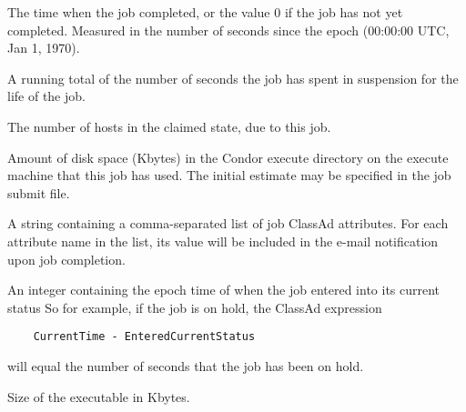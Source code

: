 \begin{description}
\item[\AdAttr{CompletionDate}:]  The time when the job completed,
or the value 0 if the job has not yet completed.
Measured in the
number of seconds since the epoch (00:00:00 UTC, Jan 1, 1970).

\item[\AdAttr{CumulativeSuspensionTime}:]  A running total of the number of
seconds the job has spent in suspension for the life of the job.

\item[\AdAttr{CurrentHosts}:]  The number of hosts in the claimed state,
due to this job.

\item[\AdAttr{DiskUsage}:] Amount of disk space (Kbytes) in the Condor
execute directory on the execute machine that this job has used.
The initial estimate may be specified in the job
submit file.

\item[\AdAttr{EmailAttributes}:]  A string containing a comma-separated
list of job ClassAd attributes. For each attribute name in the list,
its value will be included in the e-mail notification upon job completion.

\item[\AdAttr{EnteredCurrentStatus}:]  An integer containing the
epoch time of when the job entered into its current status
So for example, if the job is on hold, the ClassAd expression
\begin{verbatim}
    CurrentTime - EnteredCurrentStatus
\end{verbatim}
will equal the number of seconds that the job has been on hold.

\item[\AdAttr{ExecutableSize}:]  Size of the executable in Kbytes.


\end{description}
